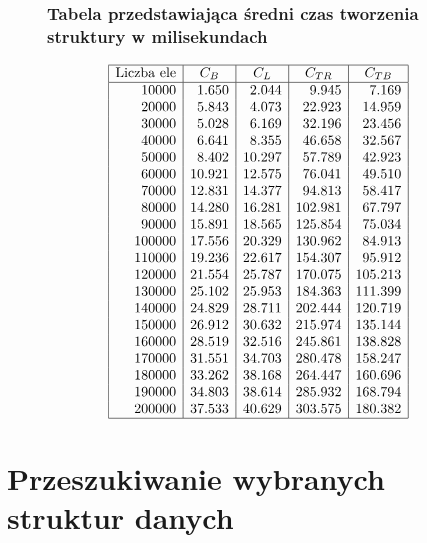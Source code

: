 \documentclass[polish,polish,a4paper]{article}
\begin{document}
\begin{spacing}{1.5}
\begin{figure}[H]
		\subsubsection*{Tabela przedstawiająca średni czas tworzenia struktury w milisekundach}
		\centering
		\begin{equation*}
		\begin{array}{|r|r|r|r|r|}
		\hline
		\multicolumn{1}{|c|}{$Liczba ele$}&\multicolumn{1}{c|}{C_{B}}&\multicolumn{1}{c|}{C_{L}}&\multicolumn{1}{c|}{C_{TR}}&\multicolumn{1}{c|}{C_{TB}}\\ \hline
		10000&1.650&2.044&9.945&7.169\\
		20000&5.843&4.073&22.923&14.959\\
		30000&5.028&6.169&32.196&23.456\\
		40000&6.641&8.355&46.658&32.567\\
		50000&8.402&10.297&57.789&42.923\\
		60000&10.921&12.575&76.041&49.510\\
		70000&12.831&14.377&94.813&58.417\\
		80000&14.280&16.281&102.981&67.797\\
		90000&15.891&18.565&125.854&75.034\\
		100000&17.556&20.329&130.962&84.913\\
		110000&19.236&22.617&154.307&95.912\\
		120000&21.554&25.787&170.075&105.213\\
		130000&25.102&25.953&184.363&111.399\\
		140000&24.829&28.711&202.444&120.719\\
		150000&26.912&30.632&215.974&135.144\\
		160000&28.519&32.516&245.861&138.828\\
		170000&31.551&34.703&280.478&158.247\\
		180000&33.262&38.168&264.447&160.696\\
		190000&34.803&38.614&285.932&168.794\\
		200000&37.533&40.629&303.575&180.382\\\hline		
		\end{array}
		\end{equation*}
\end{figure}
	

\section{Przeszukiwanie wybranych struktur danych}	


\end{spacing}
\end{document}
